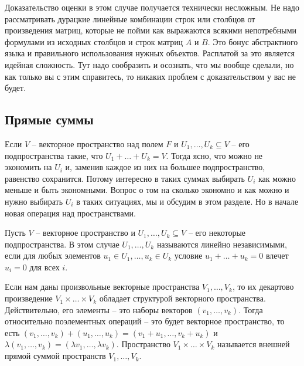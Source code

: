 Доказательство оценки в этом случае получается технически несложным. Не надо рассматривать дурацкие линейные комбинации строк или столбцов от произведения матриц, которые не пойми как выражаются всякими непотребными формулами из исходных столбцов и строк матриц $A$ и $B$. Это бонус абстрактного языка и правильного использования нужных объектов. Расплатой за это является идейная сложность. Тут надо сообразить и осознать, что мы вообще сделали, но как только вы с этим справитесь, то никаких проблем с доказательством у вас не будет.

\subsection{Прямые суммы}

Если $V$ -- векторное пространство над полем $F$ и $U_1,\ldots,U_k\subseteq V$ -- его подпространства такие, что $U_1 + \ldots + U_k = V$. Тогда ясно, что можно не экономить на $U_i$ и, заменив каждое из них на большее подпространство, равенство сохранится. Потому интересно в таких суммах выбирать $U_i$ как можно меньше и быть экономными. Вопрос о том на сколько экономно и как можно и нужно выбирать $U_i$ в таких ситуациях, мы и обсудим в этом разделе. Но в начале новая операция над пространствами.

\begin{definition}\label{def::IndepSpaces}
Пусть $V$ -- векторное пространство и $U_1,\ldots,U_k\subseteq V$ -- его некоторые подпространства. В этом случае $U_1,\ldots, U_k$ называются линейно независимыми, если для любых элементов $u_1\in U_1, \ldots, u_k\in U_k$ условие $u_1 + \ldots + u_k = 0$ влечет $u_i = 0$ для всех $i$.
\end{definition}

\begin{definition}
Если нам даны произвольные векторные пространства $V_1,\ldots, V_k$, то их декартово произведение $V_1\times\ldots\times V_k$ обладает структурой векторного пространства. Действительно, его элементы -- это наборы векторов $(v_1,\ldots,v_k)$. Тогда относительно поэлементных операций -- это будет векторное пространство, то есть
$(v_1,\ldots,v_k) + (u_1,\ldots,u_k) = (v_1 + u_1,\ldots,v_k + u_k)$ и $\lambda(v_1,\ldots,v_k) = (\lambda v_1, \ldots, \lambda v_k)$. Пространство $V_1\times\ldots \times V_k$ называется внешней прямой суммой пространств $V_1,\ldots, V_k$.
\end{definition}

